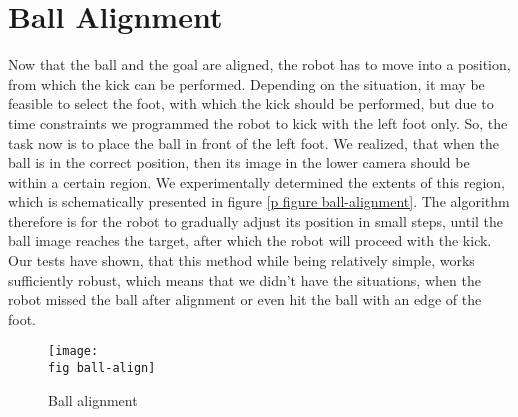 \section{Ball Alignment}

Now that the ball and the goal are aligned, the robot has to move into a
position, from which the kick can be performed. Depending on the situation, it
may be feasible to select the foot, with which the kick should be performed,
but due to time constraints we programmed the robot to kick with the left foot
only. So, the task now is to place the ball in front of the left foot. We
realized, that when the ball is in the correct position, then its image in the
lower camera should be within a certain region. We experimentally determined
the extents of this region, which is schematically presented in figure \ref{p
  figure ball-alignment}. The algorithm therefore is for the robot to gradually
adjust its position in small steps, until the ball image reaches the target,
after which the robot will proceed with the kick. Our tests have shown, that
this method while being relatively simple, works sufficiently robust, which
means that we didn't have the situations, when the robot missed the ball after
alignment or even hit the ball with an edge of the foot.

\begin{figure}[ht]
  \texttt{[image: \\fig ball-align]}
  \caption{Ball alignment}
  \label{p figure ball-alignment}
\end{figure}

